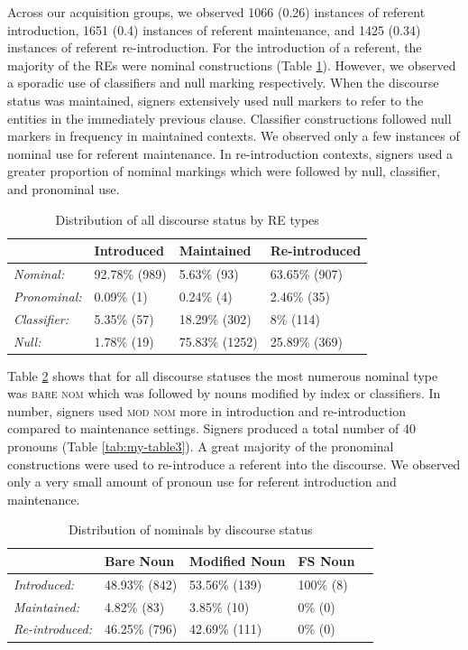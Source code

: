 \documentclass[review]{elsarticle} %
\begin{document}
Across our acquisition groups, we observed 1066 (0.26) instances of
referent introduction, 1651 (0.4) instances of referent maintenance, and
1425 (0.34) instances of referent re-introduction. For the introduction
of a referent, the majority of the REs were nominal constructions (Table
\ref{tab:my-table}). However, we observed a sporadic use of classifiers
and null marking respectively. When the discourse status was maintained,
signers extensively used null markers to refer to the entities in the
immediately previous clause. Classifier constructions followed null
markers in frequency in maintained contexts. We observed only a few
instances of nominal use for referent maintenance. In re-introduction
contexts, signers used a greater proportion of nominal markings which
were followed by null, classifier, and pronominal use.

\begin{table}
\small
\caption{Distribution of all discourse status by RE types}
\label{tab:my-table}
\begin{tabular}{llll}
\hline
                     & Introduced    & Maintained     & Re-introduced \\ \hline
\textit{Nominal:}    & 92.78\% (989) & 5.63\% (93)    & 63.65\% (907) \\
\textit{Pronominal:} & 0.09\% (1)    & 0.24\% (4)     & 2.46\% (35)   \\
\textit{Classifier:} & 5.35\% (57)   & 18.29\% (302)  & 8\% (114)     \\
\textit{Null:}       & 1.78\% (19)   & 75.83\% (1252) & 25.89\% (369) \\ \hline
\end{tabular}%
\end{table}

Table \ref{tab:my-table2} shows that for all discourse statuses the most
numerous nominal type was \textsc{bare nom} which was followed by nouns
modified by index or classifiers. In number, signers used
\textsc{mod nom} more in introduction and re-introduction compared to
maintenance settings. Signers produced a total number of 40 pronouns
(Table \ref{tab:my-table3}). A great majority of the pronominal
constructions were used to re-introduce a referent into the discourse.
We observed only a very small amount of pronoun use for referent
introduction and maintenance.

\begin{table}
\small
\caption{Distribution of nominals by discourse status}
\label{tab:my-table2}
\begin{tabular}{lllll}
\hline
                        & Bare Noun  & Modified Noun & FS Noun \\ \hline
\textit{Introduced:}    & 48.93\% (842) & 53.56\% (139)     & 100\% (8) \\
\textit{Maintained:}    & 4.82\% (83)  & 3.85\% (10)      & 0\% (0) \\
\textit{Re-introduced:} & 46.25\% (796) & 42.69\% (111)     & 0\% (0) \\ \hline
\end{tabular}
\end{table}
\end{document}
